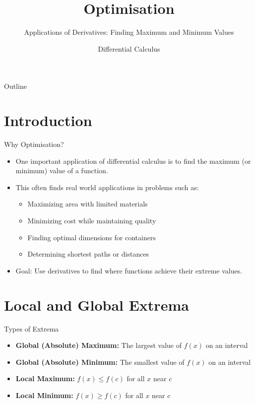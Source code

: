 \documentclass[aspectratio=169]{beamer}
\title{Optimisation}
\subtitle{Applications of Derivatives: Finding Maximum and Minimum Values}
\author{Differential Calculus}
\date{}
\begin{document}
\begin{frame}
\titlepage
\end{frame}

\begin{frame}{Outline}
\tableofcontents
\end{frame}

\section{Introduction}

\begin{frame}{Why Optimisation?}
\begin{itemize}
    \item One important application of differential calculus is to find the maximum (or minimum) value of a function.
    \item This often finds real world applications in problems such as:
    \begin{itemize}
        \item Maximizing area with limited materials
        \item Minimizing cost while maintaining quality
        \item Finding optimal dimensions for containers
        \item Determining shortest paths or distances
    \end{itemize}
    \item Goal: Use derivatives to find where functions achieve their extreme values.
\end{itemize}
\end{frame}

\section{Local and Global Extrema}

\begin{frame}{Types of Extrema}
\begin{itemize}
    \item \textbf{Global (Absolute) Maximum:} The largest value of $f(x)$ on an interval
    \item \textbf{Global (Absolute) Minimum:} The smallest value of $f(x)$ on an interval
    \item \textbf{Local Maximum:} $f(x) \leq f(c)$ for all $x$ near $c$
    \item \textbf{Local Minimum:} $f(x) \geq f(c)$ for all $x$ near $c$
\end{itemize}
\end{frame}
\end{document}
